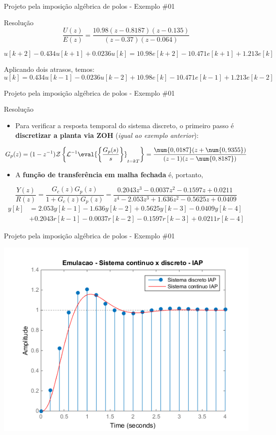 \begin{frame}{Projeto pela imposição algébrica de polos - Exemplo \#01}
\begin{block}{Resolução}
$$\dfrac{U(z)}{E(z)}=\dfrac{\num{10,98}(z-\num{0,8187})(z-\num{0,135})}{(z-\num{0,37})(z-\num{0,064})}$$

$$u[k+2] - \num{0,434} u[k+1] + \num{0,0236} u[k] =\num{10,98}e[k+2]-\num{10,471}e[k+1]+\num{1,213}e[k]$$

Aplicando dois atrasos, temos:
$$u[k] = \num{0,434} u[k-1] - \num{0,0236} u[k-2] + \num{10,98}e[k]-\num{10,471}e[k-1]+\num{1,213}e[k-2]$$
\end{block}
\end{frame}

\begin{frame}{Projeto pela imposição algébrica de polos - Exemplo \#01}
\begin{block}{Resolução}
\begin{itemize}
    \item Para verificar a resposta temporal do sistema discreto, o primeiro passo é \textbf{discretizar a planta via ZOH} (\textit{igual ao exemplo anterior}):
\end{itemize}
$$G_p(z)=(1-z^{-1})\mathcal{Z}\left\lbrace \mathcal{L}^{-1}\eval{\left\lbrace \dfrac{G_p(s)}{s}\right\rbrace}_{t=kT} \right\rbrace =\dfrac{\num{0,0187}(z+\num{0,9355})}{(z-1)(z-\num{0,8187})}$$
\begin{itemize}
    \item A \textbf{função de transferência em malha fechada} é, portanto,
\end{itemize}
$$\dfrac{Y(z)}{R(z)}=\dfrac{G_c(z)G_p(z)}{1+G_c(z)G_p(z)}=\dfrac{\num{0,2043}z^3-\num{0,0037}z^2-\num{0,1597}z+\num{0,0211}}{z^{4}-\num{2,053}z^3+\num{1,636}z^2-\num{0,5625}z + \num{0,0409}}$$
\begin{align*}
    y[k]&=\num{2,053}y[k-1]-\num{1,636}y[k-2]+ \num{0,5625}y[k-3]-\num{0,0409}y[k-4] \\
    &+\num{0,2043}r[k-1]-\num{0,0037}r[k-2]-\num{0,1597}r[k-3]+\num{0,0211}r[k-4]
\end{align*}
\end{block}
\end{frame}

\begin{frame}{Projeto pela imposição algébrica de polos - Exemplo \#01}
\centerline{\includegraphics[width=0.8\linewidth]{Figuras/Ch10/fig6.png}}
\end{frame}

